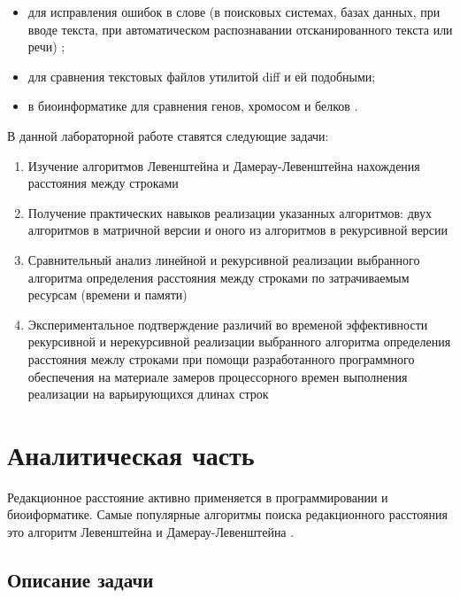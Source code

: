 \documentclass[a4paper,12pt]{article}
\begin{document}
\begin{itemize}
    \item для исправления ошибок в слове (в поисковых системах, базах
        данных, при вводе текста, при автоматическом распознавании
        отсканированного текста или речи) \cite{habr};

    \item для сравнения текстовых файлов утилитой diff и ей подобными;

    \item в биоинформатике для сравнения генов, хромосом и белков \cite{bio}.
\end{itemize}

В данной лабораторной работе ставятся следующие задачи:

\begin{enumerate}
    \item Изучение алгоритмов Левенштейна и Дамерау-Левенштейна нахождения
        расстояния между строками
    \item Получение практических навыков реализации указанных алгоритмов:
        двух алгоритмов в матричной версии и оного из алгоритмов в рекурсивной
        версии
    \item Сравнительный анализ линейной и рекурсивной реализации выбранного
        алгоритма определения расстояния между строками по затрачиваемым
        ресурсам (времени и памяти)
    \item Экспериментальное подтверждение различий во временой эффективности
        рекурсивной и нерекурсивной реализации выбранного алгоритма
        определения расстояния межлу строками при помощи разработанного
        программного обеспечения на материале замеров процессорного времен
        выполнения реализации на варьирующихся длинах строк
\end{enumerate}

\newpage
\section{Аналитическая часть}

Редакционное расстояние активно применяется в программировании и биоиформатике.
Самые популярные алгоритмы поиска редакционного расстояния это алгоритм
Левенштейна и Дамерау-Левенштейна \cite{habr}.

\subsection{Описание задачи}
\end{document}
